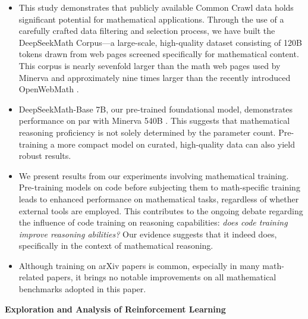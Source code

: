 \begin{itemize}[topsep=0pt]
    \item This study demonstrates that publicly available Common Crawl data holds significant potential for mathematical applications. Through the use of a carefully crafted data filtering and selection process, we have built the DeepSeekMath Corpus—a large-scale, high-quality dataset consisting of 120B tokens drawn from web pages screened specifically for mathematical content. This corpus is nearly sevenfold larger than the math web pages used by Minerva \citep{minerva} and approximately nine times larger than the recently introduced OpenWebMath \citep{openwebmath}.

\item DeepSeekMath-Base 7B, our pre-trained foundational model, demonstrates performance on par with Minerva 540B \citep{minerva}. This suggests that mathematical reasoning proficiency is not solely determined by the parameter count. Pre-training a more compact model on curated, high-quality data can also yield robust results.

\item We present results from our experiments involving mathematical training. Pre-training models on code before subjecting them to math-specific training leads to enhanced performance on mathematical tasks, regardless of whether external tools are employed. This contributes to the ongoing debate regarding the influence of code training on reasoning capabilities: \textit{does code training improve reasoning abilities?} Our evidence suggests that it indeed does, specifically in the context of mathematical reasoning.

    \item Although training on arXiv papers is common, especially in many math-related papers, it brings no notable improvements on all mathematical benchmarks adopted in this paper.
\end{itemize}

\textbf{Exploration and Analysis of Reinforcement Learning}

